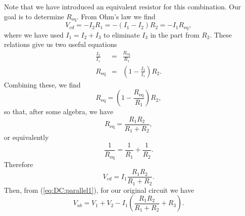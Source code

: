 Note that we have introduced an equivalent resistor for this combination. Our
goal is to determine $R_{\mbox{eq}}$. From Ohm's law we find
$$
V_{cd}=-I_2R_1=-(I_1-I_2)R_2=-I_1R_{\mbox{eq}},
$$
where we have used $I_1=I_2+I_3$ to eliminate $I_3$ in the part from $R_2$.
These relations give us two useful equations
\begin{eqnarray*}
\frac{I_2}{I_1} &=& \frac{R_{\mbox{eq}}}{R_1} \\
R_{\mbox{eq}} &=& \left(1-\frac{I_2}{I_1}\right) R_2.
\end{eqnarray*}
Combining these, we find
$$
R_{\mbox{eq}} = \left(1- \frac{R_{\mbox{eq}}}{R_1} \right) R_2,
$$
so that, after some algebra, we have
$$
R_{\mbox{eq}} = \frac{R_1R_2}{R_1+R_2},
$$
or equivalently
\begin{equation}
\frac{1}{R_{\mbox{eq}}} = \frac{1}{R_1}+\frac{1}{R_2}.
\label{eq:DC:twoparallel}
\end{equation}
Therefore 
$$
V_{cd} = I_1 \frac{R_1R_2}{R_1+R_2}. 
$$
Then, from (\ref{eq:DC:parallel1}), for our original circuit we have
$$
V_{ab} = V_1+V_2- I_1 \left( \frac{R_1R_2}{R_1+R_2} +R_3 \right).
$$ 

